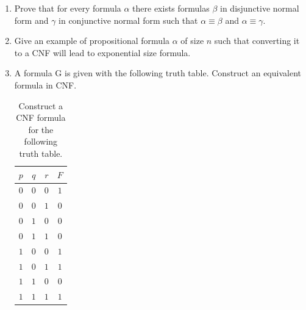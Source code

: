 \begin{exercise}
\begin{enumerate}
\item Prove that for every formula $\alpha$ there exists formulas $\beta$ in disjunctive normal form and $\gamma$ in conjunctive normal form such that $\alpha \equiv \beta$ and $\alpha \equiv \gamma$.
\item Give an example of propositional formula $\alpha$ of size $n$ such that converting it to a CNF will lead to exponential size formula.
\item A formula G is given with the following truth table. Construct an equivalent formula in CNF.
\begin{table}[H]
\centering
\begin{tabular}{c c c|c}
$p$ & $q$ & $r$ & $F$ \\
\hline
$0$ & $0$ & $0$ & $1$ \\
$0$ & $0$ & $1$ & $0$ \\
$0$ & $1$ & $0$ & $0$ \\
$0$ & $1$ & $1$ & $0$ \\
$1$ & $0$ & $0$ & $1$ \\
$1$ & $0$ & $1$ & $1$ \\
$1$ & $1$ & $0$ & $0$ \\
$1$ & $1$ & $1$ & $1$ 
\end{tabular}
\caption{Construct a CNF formula for the following truth table.}
\end{table}
\end{enumerate}
\end{exercise}

